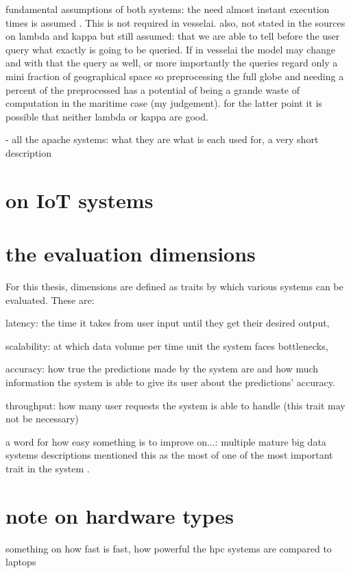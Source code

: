 fundamental assumptions of both systems:  the need almost instant execution times is assumed \cite{lambdakappa}. This is not required in vesselai. also, not stated in the sources on lambda and kappa but still assumed: that we are able to tell before the user query what exactly is going to be queried. If in vesselai the model may change and with that the query as well, or more importantly the queries regard only a mini fraction of geographical space so preprocessing the full globe and needing a percent of the preprocessed has a potential of being a grande waste of computation in the maritime case (my judgement). for the latter point it is possible that neither lambda or kappa are good.

- all the apache systems: what they are what is each used for, a very short description

\section{on IoT systems}

\section{the evaluation dimensions}

For this thesis, dimensions are defined as traits by which various systems can be evaluated. These are:

latency: the time it takes from user input until they get their desired output,

scalability: at which data volume per time unit the system faces bottlenecks,

accuracy: how true the predictions made by the system are and how much information the system is able to give its user about the predictions' accuracy.

throughput: how many user requests the system is able to handle (this trait may not be necessary)

a word for how easy something is to improve on...: multiple mature big data systems descriptions mentioned this as the most of one of the most important trait in the system \cite{uber} \cite{facebook}.

\section{note on hardware types}

something on how fast is fast, how powerful the hpc systems are compared to laptops

